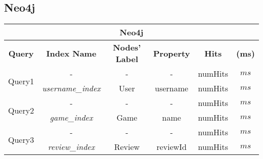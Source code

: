 \subsection{Neo4j}
	\begin{center}
	\begin{tabular}{ |c|c|c|c|c|c| } 
		\hline
		\multicolumn{6}{|c|}{\textbf{Neo4j}}\\
		\hline
		\textbf{Query}&\textbf{Index Name} & \textbf{Nodes' Label} &\textbf{Property} & \textbf{Hits} & \textbf{(ms)} \\ 
		\hline
		\multirow{2}{*}{Query1} & - & - & - & numHits & $ms$ \\ & \emph{username\_index} & User & username & numHits & $ms$  \\ 
		\hline
		\multirow{2}{*}{Query2} & - & - & - & numHits & $ms$ \\ & \emph{game\_index} & Game & name & numHits & $ms$  \\
		\hline 
		\multirow{2}{*}{Query3} & - & - & - & numHits & $ms$ \\ & \emph{review\_index} & Review & reviewId & numHits & $ms$  \\ 
		\hline
	\end{tabular}
\end{center}